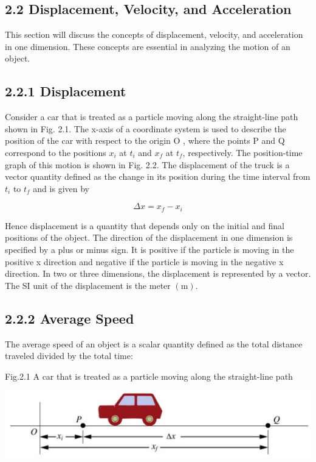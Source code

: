 \documentclass[10pt]{article}
\begin{document}
\subsection*{2.2 Displacement, Velocity, and Acceleration}
This section will discuss the concepts of displacement, velocity, and acceleration in one dimension. These concepts are essential in analyzing the motion of an object.

\subsection*{2.2.1 Displacement}
Consider a car that is treated as a particle moving along the straight-line path shown in Fig. 2.1. The x-axis of a coordinate system is used to describe the position of the car with respect to the origin O , where the points P and Q correspond to the positions $x_{i}$ at $t_{i}$ and $x_{f}$ at $t_{f}$, respectively. The position-time graph of this motion is shown in Fig. 2.2. The displacement of the truck is a vector quantity defined as the change in its position during the time interval from $t_{i}$ to $t_{f}$ and is given by

$$
\Delta x=x_{f}-x_{i}
$$

Hence displacement is a quantity that depends only on the initial and final positions of the object. The direction of the displacement in one dimension is specified by a plus or minus sign. It is positive if the particle is moving in the positive x direction and negative if the particle is moving in the negative x direction. In two or three dimensions, the displacement is represented by a vector. The SI unit of the displacement is the meter $(\mathrm{m})$.

\subsection*{2.2.2 Average Speed}
The average speed of an object is a scalar quantity defined as the total distance traveled divided by the total time:

Fig.2.1 A car that is treated as a particle moving along the straight-line path

\begin{center}
\includegraphics[max width=\textwidth]{2024_09_13_db1f357d2aad0a03eb2eg-028}
\end{center}
\end{document}
